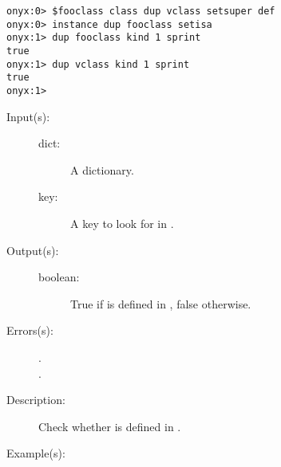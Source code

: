 \begin{description}
\begin{description}
\begin{verbatim}
onyx:0> $fooclass class dup vclass setsuper def
onyx:0> instance dup fooclass setisa
onyx:1> dup fooclass kind 1 sprint
true
onyx:1> dup vclass kind 1 sprint
true
onyx:1>
		\end{verbatim}
	\end{description}
\label{systemdict:known}
\item[{\onyxop{dict key}{known}{boolean}}: ]
	\begin{description}\item[]
	\item[Input(s): ]
		\begin{description}\item[]
		\item[dict: ]
			A dictionary.
		\item[key: ]
			A key to look for in .
		\end{description}
	\item[Output(s): ]
		\begin{description}\item[]
		\item[boolean: ]
			True if  is defined in , false
			otherwise.
		\end{description}
	\item[Errors(s): ]
		\begin{description}\item[]
		\item[.]
		\item[.]
		\end{description}
	\item[Description: ]
		Check whether  is defined in .
	\item[Example(s): ]\begin{verbatim}


\end{verbatim}
\end{description}
\end{description}
